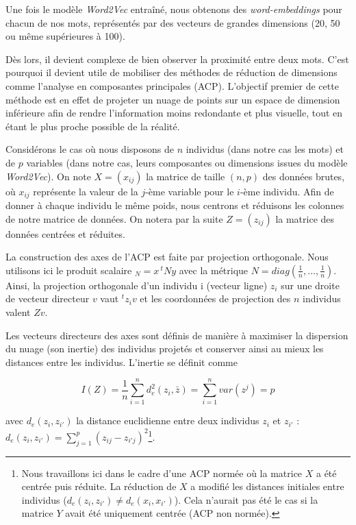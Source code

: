 \documentclass[11pt,french,french]{article}
\let\rmarkdownfootnote\footnote%
\def\footnote{\protect\rmarkdownfootnote}
\begin{document}
Une fois le modèle \emph{Word2Vec} entraîné, nous obtenons des
\emph{word-embeddings} pour chacun de nos mots, représentés par des
vecteurs de grandes dimensions (20, 50 ou même supérieures à 100).

Dès lors, il devient complexe de bien observer la proximité entre deux
mots. C'est pourquoi il devient utile de mobiliser des méthodes de
réduction de dimensions comme l'analyse en composantes principales
(ACP). L'objectif premier de cette méthode est en effet de projeter un
nuage de points sur un espace de dimension inférieure afin de rendre
l'information moins redondante et plus visuelle, tout en étant le plus
proche possible de la réalité.

Considérons le cas où nous disposons de \(n\) individus (dans notre cas
les mots) et de \(p\) variables (dans notre cas, leurs composantes ou
dimensions issues du modèle \emph{Word2Vec}). On note \(X = (x_{ij})\)
la matrice de taille \((n,p)\) des données brutes, où \(x_{ij}\)
représente la valeur de la \(j\)-ème variable pour le \(i\)-ème
individu. Afin de donner à chaque individu le même poids, nous centrons
et réduisons les colonnes de notre matrice de données. On notera par la
suite \(Z = (z_{ij})\) la matrice des données centrées et réduites.

La construction des axes de l'ACP est faite par projection orthogonale.
Nous utilisons ici le produit scalaire \(<x,y>_{N} = x\,^t N y\) avec la
métrique \(N = diag(\frac{1}{n},...,\frac{1}{n})\). Ainsi, la projection
orthogonale d'un individu i (vecteur ligne) \(z_i\) sur une droite de
vecteur directeur \(v\) vaut \(^tz_iv\) et les coordonnées de projection
des \(n\) individus valent \(Zv\).

Les vecteurs directeurs des axes sont définis de manière à maximiser la
dispersion du nuage (son inertie) des individus projetés et conserver
ainsi au mieux les distances entre les individus. L'inertie se définit
comme

\[I(Z) = \frac{1}{n} \sum \limits_{i = 1}^n d_{e}^2(z_i,\bar{z}) = \sum \limits_{i = 1}^n var(z^j) = p\]

avec \(d_{e}(z_i,z_{i'})\) la distance euclidienne entre deux individus
\(z_i\) et \(z_{i'}\) :
\(d_{e}(z_i,z_{i'}) = \sum \limits_{j=1}^p (z_{ij} - z_{i'j})^2\)\footnote{Nous
  travaillons ici dans le cadre d'une ACP normée où la matrice \(X\) a
  été centrée puis réduite. La réduction de \(X\) a modifié les
  distances initiales entre individus
  (\(d_{e}(z_i,z_{i'}) \neq d_{e}(x_i,x_{i'})\)). Cela n'aurait pas été
  le cas si la matrice \(Y\) avait été uniquement centrée (ACP non
  normée).}.
\end{document}
